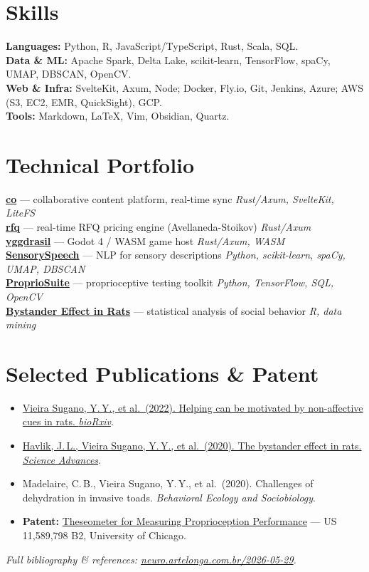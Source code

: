 \documentclass[a4paper,10pt]{article}
\begin{document}
\section*{Skills}
\textbf{Languages:} Python, R, JavaScript/TypeScript, Rust, Scala, SQL.\\
\textbf{Data \& ML:} Apache Spark, Delta Lake, scikit-learn, TensorFlow, spaCy, UMAP, DBSCAN, OpenCV.\\
\textbf{Web \& Infra:} SvelteKit, Axum, Node; Docker, Fly.io, Git, Jenkins, Azure; AWS (S3, EC2, EMR, QuickSight), GCP.\\
\textbf{Tools:} Markdown, LaTeX, Vim, Obsidian, Quartz.

\section*{Technical Portfolio}
\href{https://co.artelonga.com.br}{\textbf{co}} --- collaborative content platform, real-time sync
\hfill \textit{Rust/Axum, SvelteKit, LiteFS}\\
\href{https://rfq.artelonga.com.br}{\textbf{rfq}} --- real-time RFQ pricing engine (Avellaneda-Stoikov)
\hfill \textit{Rust/Axum}\\
\href{https://yggdrasil.artelonga.com.br}{\textbf{yggdrasil}} --- Godot 4 / WASM game host
\hfill \textit{Rust/Axum, WASM}\\
\href{https://github.com/yurisugano/SensorySpeech}{\textbf{SensorySpeech}} --- NLP for sensory
descriptions \hfill \textit{Python, scikit-learn, spaCy, UMAP, DBSCAN}\\
\href{https://github.com/yurisugano/ProprioSuite}{\textbf{ProprioSuite}} --- proprioceptive
testing toolkit \hfill \textit{Python, TensorFlow, SQL, OpenCV}\\
\href{https://github.com/yurisugano/Bystander-Effect-Rat-Analysis}{\textbf{Bystander Effect in Rats}}
--- statistical analysis of social behavior \hfill \textit{R, data mining}

\section*{Selected Publications \& Patent}
\begin{itemize}
  \item \href{https://doi.org/10.1101/2022.07.01.498150}{Vieira Sugano, Y.\,Y., et al.\ (2022). Helping can be motivated by non-affective cues in rats. \textit{bioRxiv}}.
  \item \href{https://doi.org/10.1126/sciadv.abb4205}{Havlik, J.\,L., Vieira Sugano, Y.\,Y., et al.\ (2020). The bystander effect in rats. \textit{Science Advances}}.
  \item Madelaire, C.\,B., Vieira Sugano, Y.\,Y., et al.\ (2020). Challenges of dehydration in invasive toads. \textit{Behavioral Ecology and Sociobiology}.
  \item \textbf{Patent:} \href{https://patents.google.com/patent/US11589798B2/en}{Theseometer for Measuring Proprioception Performance} — US 11,589,798 B2, University of Chicago.
\end{itemize}

\vspace{2pt}\textit{\small Full bibliography \& references: \href{https://neuro.artelonga.com.br/2026-05-29/}{neuro.artelonga.com.br/2026-05-29}.}
\end{document}
